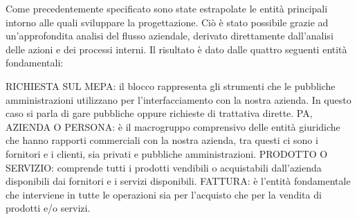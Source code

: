 Come precedentemente specificato sono state estrapolate le entità principali intorno alle quali sviluppare la progettazione. Ciò è stato possibile grazie ad un'approfondita analisi del flusso aziendale, derivato direttamente dall'analisi delle azioni e dei processi interni.\newline
Il risultato è dato dalle quattro seguenti entità fondamentali: \newline

\noindent{}
\newline
\newline
RICHIESTA SUL MEPA: il blocco rappresenta gli strumenti che le pubbliche amministrazioni utilizzano per  l'interfacciamento con la nostra azienda. In questo caso si parla di gare pubbliche oppure richieste di trattativa dirette. \newline
PA, AZIENDA O PERSONA: è il macrogruppo comprensivo delle entità giuridiche che hanno rapporti commerciali con la nostra azienda, tra questi ci sono i fornitori e i clienti, sia privati e pubbliche amministrazioni.\newline
PRODOTTO O SERVIZIO: comprende tutti i prodotti vendibili o acquistabili dall'azienda disponibili dai fornitori e i servizi disponibili.\newline
FATTURA: è l'entità fondamentale che interviene in tutte le operazioni sia per l'acquisto che per la vendita di prodotti e/o servizi.

\newpage
